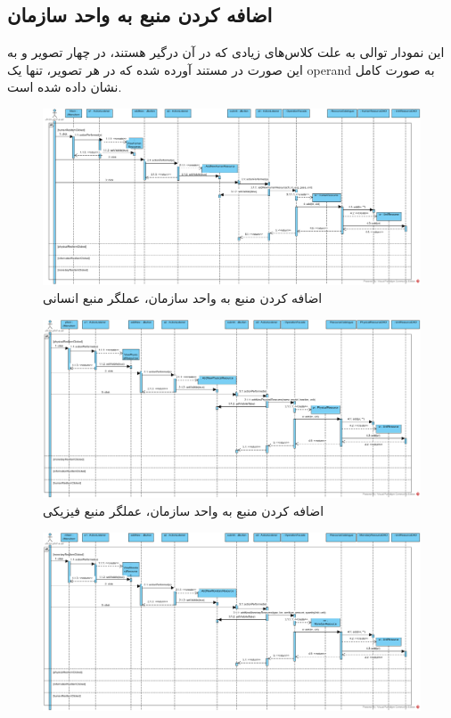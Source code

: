 \begin{landscape}
\section{اضافه کردن منبع به واحد سازمان}
این نمودار توالی به علت کلاس‌های زیادی که در آن درگیر هستند، در چهار تصویر و به این صورت در مستند آورده شده که در هر تصویر، تنها یک operand به صورت کامل نشان داده شده است.
\begin{figure}[H]
	\centering
	\includegraphics[scale=0.5]{img/sequence-design/AddResourceToUnit_HUMAN}
	\caption{اضافه کردن منبع به واحد سازمان، عملگر منبع انسانی}
\end{figure}
\begin{figure}[H]
	\centering
	\includegraphics[scale=0.5]{img/sequence-design/AddResourceToUnit_PHYSICAL}
	\caption{اضافه کردن منبع به واحد سازمان، عملگر منبع فیزیکی}
\end{figure}
\begin{figure}[H]
	\centering
	\includegraphics[scale=0.5]{img/sequence-design/AddResourceToUnit_MONETARY}

\end{figure}
\end{landscape}
